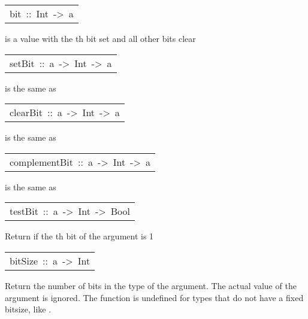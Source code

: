 \begin{haddockdesc}
\begin{haddockdesc}
\end{haddockdesc}
\begin{haddockdesc}
\item[\begin{tabular}{@{}l}
bit\ ::\ Int\ ->\ a
\end{tabular}]\haddockbegindoc
{} is a value with the th bit set and all other bits clear
\par

\end{haddockdesc}
\begin{haddockdesc}
\item[\begin{tabular}{@{}l}
setBit\ ::\ a\ ->\ Int\ ->\ a
\end{tabular}]\haddockbegindoc
{} is the same as 
\par

\end{haddockdesc}
\begin{haddockdesc}
\item[\begin{tabular}{@{}l}
clearBit\ ::\ a\ ->\ Int\ ->\ a
\end{tabular}]\haddockbegindoc
{} is the same as 
\par

\end{haddockdesc}
\begin{haddockdesc}
\item[\begin{tabular}{@{}l}
complementBit\ ::\ a\ ->\ Int\ ->\ a
\end{tabular}]\haddockbegindoc
{} is the same as 
\par

\end{haddockdesc}
\begin{haddockdesc}
\item[\begin{tabular}{@{}l}
testBit\ ::\ a\ ->\ Int\ ->\ Bool
\end{tabular}]\haddockbegindoc
Return  if the th bit of the argument is 1
\par

\end{haddockdesc}
\begin{haddockdesc}
\item[\begin{tabular}{@{}l}
bitSize\ ::\ a\ ->\ Int
\end{tabular}]\haddockbegindoc
Return the number of bits in the type of the argument.  The actual
        value of the argument is ignored.  The function  is
        undefined for types that do not have a fixed bitsize, like .
\par


\end{haddockdesc}
\end{haddockdesc}
